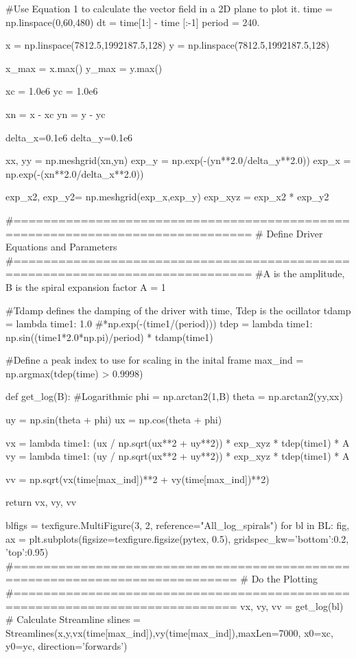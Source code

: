 \begin{pycode}[chapter5]
#Use Equation 1 to calculate the vector field in a 2D plane to plot it.
time = np.linspace(0,60,480)
dt = time[1:] - time [:-1]
period = 240.

x = np.linspace(7812.5,1992187.5,128)
y = np.linspace(7812.5,1992187.5,128)

x_max = x.max()
y_max = y.max()

xc = 1.0e6
yc = 1.0e6

xn = x - xc
yn = y - yc

delta_x=0.1e6
delta_y=0.1e6

xx, yy = np.meshgrid(xn,yn)
exp_y = np.exp(-(yn**2.0/delta_y**2.0))
exp_x = np.exp(-(xn**2.0/delta_x**2.0))

exp_x2, exp_y2= np.meshgrid(exp_x,exp_y)
exp_xyz = exp_x2 * exp_y2


#==============================================================================
# Define Driver Equations and Parameters
#==============================================================================
#A is the amplitude, B is the spiral expansion factor
A = 1

#Tdamp defines the damping of the driver with time, Tdep is the ocillator
tdamp = lambda time1: 1.0 #*np.exp(-(time1/(period)))
tdep = lambda time1: np.sin((time1*2.0*np.pi)/period) * tdamp(time1)

#Define a peak index to use for scaling in the inital frame
max_ind = np.argmax(tdep(time) > 0.9998)

def get_log(B):
    #Logarithmic
    phi = np.arctan2(1,B)
    theta = np.arctan2(yy,xx)
    
    uy = np.sin(theta + phi)
    ux =  np.cos(theta + phi)
    
    vx = lambda time1: (ux / np.sqrt(ux**2 + uy**2)) * exp_xyz * tdep(time1) * A
    vy = lambda time1: (uy / np.sqrt(ux**2 + uy**2)) * exp_xyz * tdep(time1) * A
    
    vv = np.sqrt(vx(time[max_ind])**2 + vy(time[max_ind])**2)
    
    return vx, vy, vv

blfigs = texfigure.MultiFigure(3, 2, reference="All_log_spirals")
for bl in BL:
    fig, ax = plt.subplots(figsize=texfigure.figsize(pytex, 0.5),
                           gridspec_kw={'bottom':0.2, 'top':0.95})
    #============================================================================
    # Do the Plotting
    #============================================================================
    vx, vy, vv = get_log(bl)
    # Calculate Streamline
    slines = Streamlines(x,y,vx(time[max_ind]),vy(time[max_ind]),maxLen=7000,
    x0=xc, y0=yc, direction='forwards')
    

\end{pycode}
